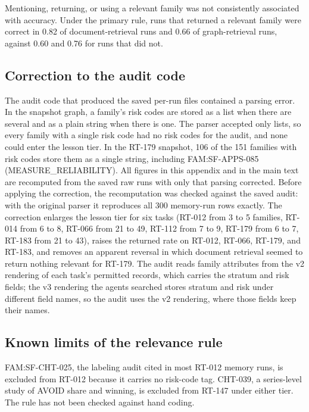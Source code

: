 \documentclass[11pt]{article}
\begin{document}
Mentioning, returning, or using a relevant family was not consistently associated with accuracy. Under the primary rule, runs that returned a relevant family were correct in 0.82 of document-retrieval runs and 0.66 of graph-retrieval runs, against 0.60 and 0.76 for runs that did not.

\subsection*{Correction to the audit code}

The audit code that produced the saved per-run files contained a parsing error. In the snapshot graph, a family's risk codes are stored as a list when there are several and as a plain string when there is one. The parser accepted only lists, so every family with a single risk code had no risk codes for the audit, and none could enter the lesson tier. In the RT-179 snapshot, 106 of the 151 families with risk codes store them as a single string, including FAM:SF-APPS-085 (MEASURE\_RELIABILITY). All figures in this appendix and in the main text are recomputed from the saved raw runs with only that parsing corrected. Before applying the correction, the recomputation was checked against the saved audit: with the original parser it reproduces all 300 memory-run rows exactly. The correction enlarges the lesson tier for six tasks (RT-012 from 3 to 5 families, RT-014 from 6 to 8, RT-066 from 21 to 49, RT-112 from 7 to 9, RT-179 from 6 to 7, RT-183 from 21 to 43), raises the returned rate on RT-012, RT-066, RT-179, and RT-183, and removes an apparent reversal in which document retrieval seemed to return nothing relevant for RT-179. The audit reads family attributes from the v2 rendering of each task's permitted records, which carries the stratum and risk fields; the v3 rendering the agents searched stores stratum and risk under different field names, so the audit uses the v2 rendering, where those fields keep their names.

\subsection*{Known limits of the relevance rule}

FAM:SF-CHT-025, the labeling audit cited in most RT-012 memory runs, is excluded from RT-012 because it carries no risk-code tag. CHT-039, a series-level study of AVOID share and winning, is excluded from RT-147 under either tier. The rule has not been checked against hand coding.
\end{document}
